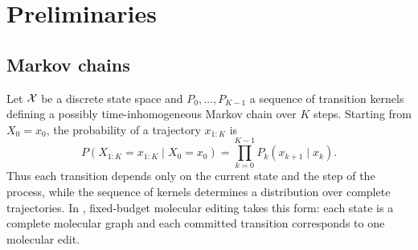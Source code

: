 %
%
%
%
\section{Preliminaries}
\label{sec:prelim}

\subsection{Markov chains}
\label{sec:prelim-chain}

Let $\mathcal{X}$ be a discrete state space and $P_0,\dots,P_{K-1}$ a sequence of transition kernels defining a possibly time-inhomogeneous Markov chain over $K$ steps. Starting from $X_0=x_0$, the probability of a trajectory $x_{1:K}$ is
\begin{equation}
P(X_{1:K}=x_{1:K}\mid X_0=x_0)=\prod_{k=0}^{K-1}P_k(x_{k+1}\mid x_k).
\label{eq:chain}
\end{equation}
Thus each transition depends only on the current state and the step of the process, while the sequence of kernels determines a distribution over complete trajectories. In \method{}, fixed-budget molecular editing takes this form: each state is a complete molecular graph and each committed transition corresponds to one molecular edit.

